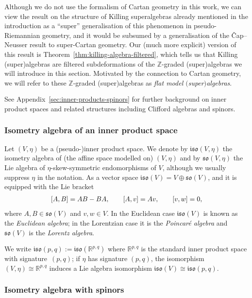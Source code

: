 \documentclass[11pt]{article}
\numberwithin{equation}{section}
\numberwithin{equation}{section}
\newcommand{\fso}{\mathfrak{so}}
\newcommand{\fiso}{\mathfrak{iso}}
\newcommand{\RR}{\mathbb{R}}
\newcommand{\ZZ}{\mathbb{Z}}
\newcommand{\1}{\mathbbm{1}}
\begin{document}
Although we do not use the formalism of Cartan geometry in this work, we can view the result on the structure of Killing superalgebras already mentioned in the introduction as a ``super'' generalisation of this phenomenon in pseudo-Riemannian geometry, and it would be subsumed by a generalisation of the \v{C}ap--Neusser result \cite{Cap2009} to super-Cartan geometry. Our (much more explicit) version of this result is Theorem~\ref{thm:killing-algebra-filtered}, which tells us that Killing (super)algebras are filtered subdeformations of the $\ZZ$-graded (super)algebras we will introduce in this section. Motivated by the connection to Cartan geometry, we will refer to these $\ZZ$-graded (super)algebras as \emph{flat model $($super$)$algebras}.

See Appendix~\ref{sec:inner-products-spinors} for further background on inner product spaces and related structures including Clifford algebras and spinors.

\subsubsection{Isometry algebra of an inner product space}

Let $(V,\eta)$ be a (pseudo-)inner product space. We denote by $\fiso(V,\eta)$ the isometry algebra of (the affine space modelled on) $(V,\eta)$ and by $\fso(V,\eta)$ the Lie algebra of $\eta$-skew-symmetric endomorphisms of $V$, although we usually suppress $\eta$ in the notation. As a vector space $\fiso(V)=V\oplus\fso(V)$, and it is equipped with the Lie bracket
\begin{align}\label{eq:flat-bracket}
 \comm{A}{B} = AB - BA,\qquad
 \comm{A}{v} = Av,\qquad
\comm{v}{w} = 0,
\end{align}
where $A,B\in\fso(V)$ and $v,w\in V$. In the Euclidean case $\fiso(V)$ is known as the \emph{Euclidean algebra}; in the Lorentzian case it is the \emph{Poincar\'e algebra} and $\fso(V)$ is the \emph{Lorentz algebra}.

We write $\fiso(p,q):=\fiso(\RR^{p,q})$ where $\RR^{p,q}$ is the standard inner product space with signature~$(p,q)$; if $\eta$ has signature $(p,q)$, the isomorphism $(V,\eta)\cong\RR^{p,q}$ induces a Lie algebra isomorphism $\fiso(V)\cong\fiso(p,q)$.

\subsubsection{Isometry algebra with spinors}
\label{sec:isom-alg-spinors}
\end{document}
